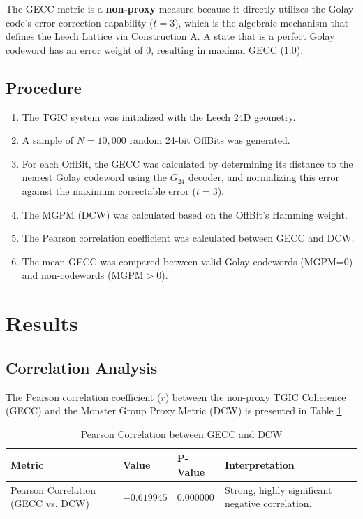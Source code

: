\documentclass[10pt, a4paper]{article}
\begin{document}
The GECC metric is a \textbf{non-proxy} measure because it directly utilizes the Golay code's error-correction capability ($t=3$), which is the algebraic mechanism that defines the Leech Lattice via Construction A. A state that is a perfect Golay codeword has an error weight of 0, resulting in maximal GECC ($1.0$).

\subsection{Procedure}

\begin{enumerate}
    \item The TGIC system was initialized with the Leech 24D geometry.
    \item A sample of $N=10,000$ random 24-bit OffBits was generated.
    \item For each OffBit, the GECC was calculated by determining its distance to the nearest Golay codeword using the $G_{24}$ decoder, and normalizing this error against the maximum correctable error ($t=3$).
    \item The MGPM (DCW) was calculated based on the OffBit's Hamming weight.
    \item The Pearson correlation coefficient was calculated between GECC and DCW.
    \item The mean GECC was compared between valid Golay codewords (MGPM=0) and non-codewords (MGPM$>0$).
\end{enumerate}

\section{Results}

\subsection{Correlation Analysis}

The Pearson correlation coefficient ($r$) between the non-proxy TGIC Coherence (GECC) and the Monster Group Proxy Metric (DCW) is presented in Table \ref{tab:correlation}.

\begin{table}[h]
    \centering
    \caption{Pearson Correlation between GECC and DCW}
    \label{tab:correlation}
    \begin{tabular}{llll}
        \toprule
        \textbf{Metric} & \textbf{Value} & \textbf{P-Value} & \textbf{Interpretation} \\
        \midrule
        Pearson Correlation (GECC vs. DCW) & $-0.619945$ & $0.000000$ & Strong, highly significant negative correlation. \\
        \bottomrule
    \end{tabular}
\end{table}
\end{document}

